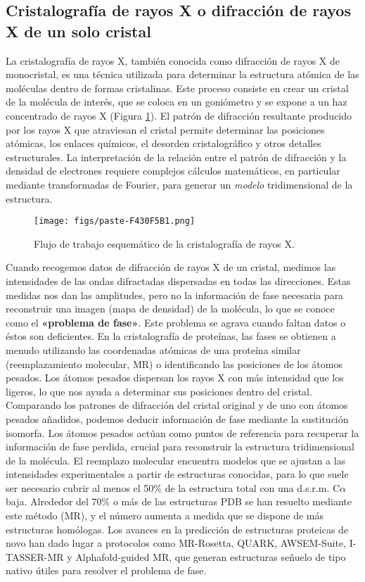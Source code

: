 \subsection{Cristalografía de rayos X o difracción de rayos X de un solo cristal}
La cristalografía de rayos X, también conocida como difracción de rayos X de monocristal, es una técnica utilizada para determinar la estructura atómica de las moléculas dentro de formas cristalinas. Este proceso consiste en crear un cristal de la molécula de interés, que se coloca en un goniómetro y se expone a un haz concentrado de rayos X (Figura \ref{fig:cristallography}). El patrón de difracción resultante producido por los rayos X que atraviesan el cristal permite determinar las posiciones atómicas, los enlaces químicos, el desorden cristalográfico y otros detalles estructurales. La interpretación de la relación entre el patrón de difracción y la densidad de electrones requiere complejos cálculos matemáticos, en particular mediante transformadas de Fourier, para generar un \textit{modelo} tridimensional de la estructura.

\begin{figure}[h]
\centering
\texttt{[image: figs/paste-F430F5B1.png]}
\caption{Flujo de trabajo esquemático de la cristalografía de rayos X. }
\label{fig:cristallography}
\end{figure}

Cuando recogemos datos de difracción de rayos X de un cristal, medimos las intensidades de las ondas difractadas dispersadas en todas las direcciones. Estas medidas nos dan las amplitudes, pero no la información de fase necesaria para reconstruir una imagen (mapa de densidad) de la molécula, lo que se conoce como el \textbf{«problema de fase»}. Este problema se agrava cuando faltan datos o éstos son deficientes. En la cristalografía de proteínas, las fases se obtienen a menudo utilizando las coordenadas atómicas de una proteína similar (reemplazamiento molecular, MR) o identificando las posiciones de los átomos pesados. Los átomos pesados dispersan los rayos X con más intensidad que los ligeros, lo que nos ayuda a determinar sus posiciones dentro del cristal. Comparando los patrones de difracción del cristal original y de uno con átomos pesados añadidos, podemos deducir información de fase mediante la sustitución isomorfa. Los átomos pesados actúan como puntos de referencia para recuperar la información de fase perdida, crucial para reconstruir la estructura tridimensional de la molécula. El reemplazo molecular encuentra modelos que se ajustan a las intensidades experimentales a partir de estructuras conocidas, para lo que suele ser necesario cubrir al menos el 50\% de la estructura total con una d.s.r.m. C$\alpha$ baja. Alrededor del 70\% o más de las estructuras PDB se han resuelto mediante este método (MR), y el número aumenta a medida que se dispone de más estructuras homólogas. Los avances en la predicción de estructuras proteicas de novo han dado lugar a protocolos como MR-Rosetta, QUARK, AWSEM-Suite, I-TASSER-MR y Alphafold-guided MR, que generan estructuras señuelo de tipo nativo útiles para resolver el problema de fase.

